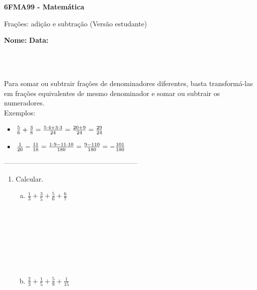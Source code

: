 \documentclass[a4paper,14pt]{article}
\begin{document}
	
	\noindent\textbf{6FMA99 - Matemática} 
	
	\begin{center}Frações: adição e subtração (Versão estudante)
	\end{center}
	
	\noindent\textbf{Nome:} \underline{\hspace{10cm}}
	\noindent\textbf{Data:} \underline{\hspace{4cm}}
	
	~ \\ ~
	\begin{multicols}{2}
		\noindent Para somar ou subtrair frações de denominadores diferentes, basta transformá-las em frações equivalentes de mesmo denominador e somar ou subtrair os numeradores. \\
		Exemplos:
		\begin{itemize}
			\item $\frac{5}{6} + \frac{3}{8} = \frac{5 \cdot 4 + 3 \cdot 3}{24} = \frac{20 + 9}{24} \\\\ = \frac{29}{24}$
			\item $\frac{1}{20} - \frac{11}{18} = \frac{1 \cdot 9 - 11 \cdot 10}{180} \\\\ = \frac{9 - 110}{180} = - \frac{101}{180}$
		\end{itemize}
		\textsubscript{---------------------------------------------------------------------}
    	\begin{enumerate}
    		\item Calcular.
    		\begin{enumerate}[a)]
    			\item $\frac{1}{3} + \frac{3}{5} + \frac{5}{6} + \frac{6}{7}$ \\\\\\\\\\\\\\\\
    			\item $\frac{2}{3} + \frac{1}{5} + \frac{5}{9} + \frac{1}{15}$ \\\\\\\\

\end{enumerate}
\end{enumerate}
\end{multicols}
\end{document}
